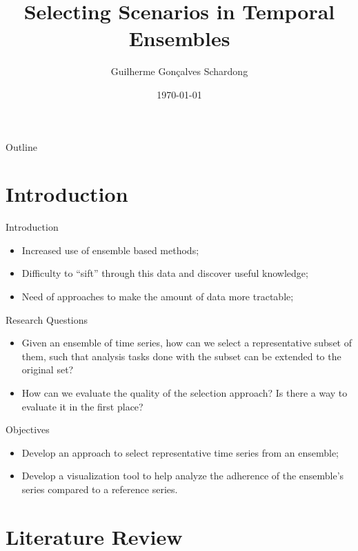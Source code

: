 \documentclass{beamer}
\title{Selecting Scenarios in Temporal Ensembles}
\author{Guilherme Gon\c{c}alves Schardong}
\date{\today}
\begin{document}
	
\begin{frame}
  \titlepage
\end{frame}

\begin{frame}{Outline}
  \tableofcontents
\end{frame}

\section{Introduction}
\begin{frame}
  \tableofcontents[currentsection]
\end{frame}

\begin{frame}{Introduction}
  \begin{itemize}
    \item Increased use of ensemble based methods;
    \item Difficulty to ``sift'' through this data and discover useful knowledge;
    \item Need of approaches to make the amount of data more tractable;
  \end{itemize}
\end{frame}

\begin{frame}{Research Questions}
  \begin{itemize}
    \item Given an ensemble of time series, how can we select a representative subset of them, such that analysis tasks done with the subset can be extended to the original set?
    \item How can we evaluate the quality of the selection approach? Is there a way to evaluate it in the first place?
  \end{itemize}
\end{frame}

\begin{frame}{Objectives}
  \begin{itemize}
    \item Develop an approach to select representative time series from an ensemble;
    \item Develop a visualization tool to help analyze the adherence of the ensemble's series compared to a reference series.
  \end{itemize}
\end{frame}

\section{Literature Review}
\begin{frame}
  \tableofcontents[currentsection]
\end{frame}
\end{document}

